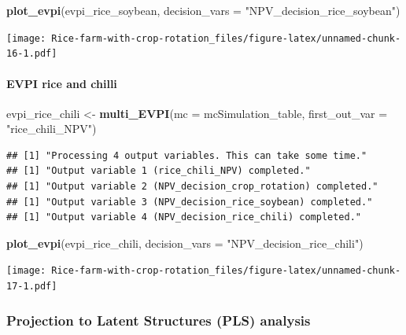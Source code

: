 \documentclass[
]{article}
\newenvironment{Shaded}{\begin{snugshade}}{\end{snugshade}}
\newcommand{\AttributeTok}[1]{\textcolor[rgb]{0.13,0.29,0.53}{#1}}
\newcommand{\FunctionTok}[1]{\textcolor[rgb]{0.13,0.29,0.53}{\textbf{#1}}}
\newcommand{\NormalTok}[1]{#1}
\newcommand{\OtherTok}[1]{\textcolor[rgb]{0.56,0.35,0.01}{#1}}
\newcommand{\StringTok}[1]{\textcolor[rgb]{0.31,0.60,0.02}{#1}}
\begin{document}
\begin{Shaded}
\begin{Highlighting}[]
\FunctionTok{plot\_evpi}\NormalTok{(evpi\_rice\_soybean, }\AttributeTok{decision\_vars =} \StringTok{"NPV\_decision\_rice\_soybean"}\NormalTok{)}
\end{Highlighting}
\end{Shaded}

\texttt{[image: Rice-farm-with-crop-rotation\_files/figure-latex/unnamed-chunk-16-1.pdf]}

\hypertarget{evpi-rice-and-chilli}{%
\paragraph{EVPI rice and chilli}\label{evpi-rice-and-chilli}}

\begin{Shaded}
\begin{Highlighting}[]
\NormalTok{evpi\_rice\_chili }\OtherTok{\textless{}{-}} \FunctionTok{multi\_EVPI}\NormalTok{(}\AttributeTok{mc =}\NormalTok{ mcSimulation\_table, }\AttributeTok{first\_out\_var =} \StringTok{"rice\_chili\_NPV"}\NormalTok{)}
\end{Highlighting}
\end{Shaded}

\begin{verbatim}
## [1] "Processing 4 output variables. This can take some time."
## [1] "Output variable 1 (rice_chili_NPV) completed."
## [1] "Output variable 2 (NPV_decision_crop_rotation) completed."
## [1] "Output variable 3 (NPV_decision_rice_soybean) completed."
## [1] "Output variable 4 (NPV_decision_rice_chili) completed."
\end{verbatim}

\begin{Shaded}
\begin{Highlighting}[]
\FunctionTok{plot\_evpi}\NormalTok{(evpi\_rice\_chili, }\AttributeTok{decision\_vars =} \StringTok{"NPV\_decision\_rice\_chili"}\NormalTok{)}
\end{Highlighting}
\end{Shaded}

\texttt{[image: Rice-farm-with-crop-rotation\_files/figure-latex/unnamed-chunk-17-1.pdf]}

\hypertarget{projection-to-latent-structures-pls-analysis}{%
\subsubsection{Projection to Latent Structures (PLS)
analysis}\label{projection-to-latent-structures-pls-analysis}}
\end{document}
